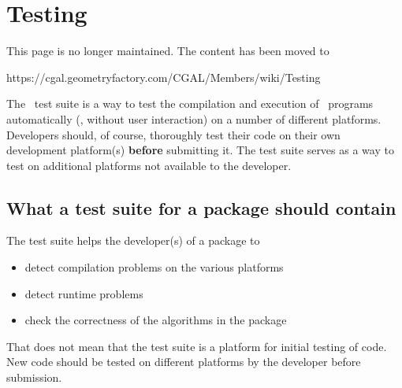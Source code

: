
\chapter{Testing\label{chap:testing}}

{\HUGE This page is no longer maintained. The content has been moved to

https://cgal.geometryfactory.com/CGAL/Members/wiki/Testing}

The \cgal\ test suite is a way to test the compilation and execution of \cgal\ 
programs automatically (\ie, without user interaction) on a number of 
different platforms.  Developers should, of course, thoroughly test their 
code on their own development platform(s) \textbf{before} submitting it.
The test suite serves as a way to test on additional platforms not available
to the developer.  

\section{What a test suite for a package should contain\label{sec:whats_in_test_suite}}

The test suite helps the developer(s) of a package to 
\begin{itemize}
\item detect compilation problems on the various platforms
\item detect runtime problems
\item check the correctness of the algorithms in the package
\end{itemize}

That does not mean that the test suite is a platform for initial testing of 
code.  New code should be tested on different platforms by the developer
before submission.

